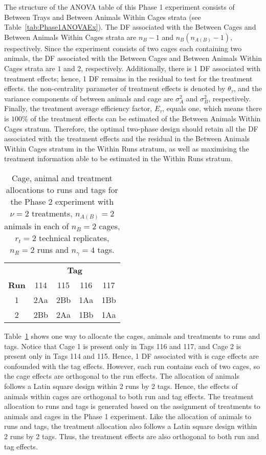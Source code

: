 The structure of the ANOVA table of this Phase 1 experiment consists of Between Trays and Between Animals Within Cages strata (see Table~\ref{tab:Phase1ANOVAEx}). The DF associated with the Between Cages and Between Animals Within Cages strata are $n_B - 1$ and $n_B(n_{A(B)} - 1)$, respectively. Since the experiment consists of two cages each containing two animals, the DF associated with the Between Cages and Between Animals Within Cages strata are $1$ and $2$, respectively. Additionally, there is 1 DF associated with treatment effects; hence, 1 DF remains in the residual to test for the treatment effects. the non-centrality parameter of treatment effects is denoted by $\theta_{\tau}$, and the  variance components of between animals and cage are $\sigma_{A}^2$ and $\sigma_{B}^2$, respectively. Finally, the treatment average efficiency factor, $E_{\tau}$, equals one, which means there is $100\%$ of the treatment effects can be estimated of the Between Animals Within Cages stratum. Therefore, the optimal two-phase design should retain all the DF associated with the treatment effects and the residual in the Between Animals Within Cages stratum in the Within Runs stratum, as well as maximising the treatment information able to be estimated in the Within Runs stratum. 

\begin{table}[ht]
\centering
\itshape
\caption{Cage, animal and treatment allocations to runs and tags for the Phase 2 experiment with $\nu = 2$ treatments, $n_{A(B)} =2$ animals in each of $n_B = 2$ cages, $r_t = 2$ technical replicates, $n_R = 2$ runs and $n_\gamma = 4$ tags.}
\begin{tabular}[t]{c|cccc}
 & \multicolumn{4}{c}{{\bf Tag}} \\
{\bf Run}  & \textnormal{114} & \textnormal{115} & \textnormal{116} & \textnormal{117} \\ 
\hline
\textnormal{1} & 2Aa & 2Bb & 1Aa & 1Bb \\  
\textnormal{2} & 2Bb & 2Aa & 1Bb & 1Aa \\  
\end{tabular} 
\label{tab:cagAniDesEx}
\end{table}
  
Table~\ref{tab:cagAniDesEx} shows one way to allocate the cages, animals and treatments to runs and tags. Notice that Cage 1 is present only in Tags 116 and 117, and Cage 2 is present only in Tags 114 and 115. Hence, 1 DF associated with is cage effects are confounded with the tag effects. However, each run contains each of two cages, so the cage effects are orthogonal to the run effects. The allocation of animals follows a Latin square design within 2 runs by 2 tags. Hence, the effects of animals within cages are orthogonal to both run and tag effects. The treatment allocation to runs and tags is generated based on the assignment of treatments to animals and cages in the Phase 1 experiment. Like the allocation of animals to runs and tags, the treatment allocation also follows a Latin square design within 2 runs by 2 tags. Thus, the treatment effects are also orthogonal to both run and tag effects.   

